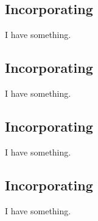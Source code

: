 \subsection{Incorporating} \label{aa} I have something.

\subsection{Incorporating} I have something.

\subsection{Incorporating } \label{aa} I have something.

\subsection{Incorporating } I have something.

